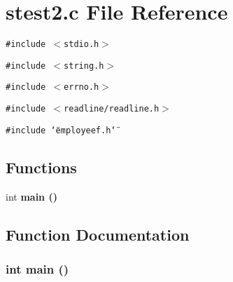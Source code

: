 \section{stest2.c File Reference}
\label{stest2_8c}
{\tt \#include $<$stdio.h$>$}\par
{\tt \#include $<$string.h$>$}\par
{\tt \#include $<$errno.h$>$}\par
{\tt \#include $<$readline/readline.h$>$}\par
{\tt \#include \char`\"{}employeef.h\char`\"{}}\par
\subsection*{Functions}
\begin{CompactItemize}
\item 
int \bf{main} ()
\end{CompactItemize}


\subsection{Function Documentation}
\subsubsection{\setlength{\rightskip}{0pt plus 5cm}int main ()}\label{stest2_8c_446c6b9a1a4dbab517fbb760870458a3}


